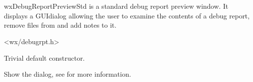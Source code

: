 
\section{}\label{wxdebugreportpreviewstd}

wxDebugReportPreviewStd is a standard debug report preview window. It displays
a GUIdialog allowing the user to examine the contents of a debug report, remove
files from and add notes to it.





<wx/debugrpt.h>







\label{wxdebugreportpreviewstdwxdebugreportpreviewstd}


Trivial default constructor.


\label{wxdebugreportpreviewstdshow}


Show the dialog, see 
 for more
information.


